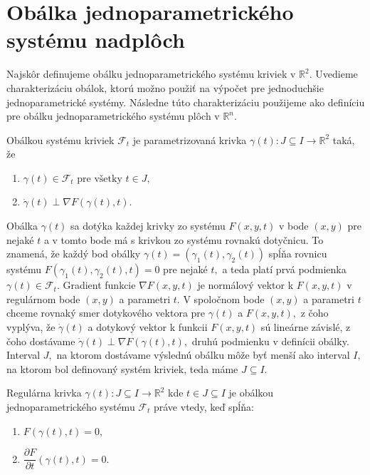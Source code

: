 \section{Obálka jednoparametrického systému nadplôch}
Najskôr definujeme obálku jednoparametrického systému kriviek v $\mathbb{R}^2$. Uvedieme charakterizáciu obálok, ktorú možno použiť na výpočet pre jednoduchšie jednoparametrické systémy. Následne túto charakterizáciu použijeme ako definíciu pre obálku jednoparametrického systému plôch v $\mathbb{R}^n$.

\begin{definition}
Obálkou systému kriviek $ \mathcal{F}_{t} $ je parametrizovaná krivka $\gamma(t) \colon J \subseteq I \rightarrow \mathbb{R}^{2}$ taká, že 
\begin{enumerate}
\item $\gamma(t) \in \mathcal{F}_{t} \text{ pre všetky } t \in J,$
\item $\dot{\gamma}(t) \perp \nabla F \left( \gamma(t), t \right).$
\end{enumerate}
\end{definition}

Obálka $\gamma(t)$ sa dotýka každej krivky zo systému $F(x,y,t)$ v bode $(x, y)$  pre nejaké $t$ a v tomto bode má s krivkou zo systému rovnakú dotyčnicu. To znamená, že každý bod obálky ${\gamma}(t) = (\gamma_{1}(t),\gamma_{2}(t))$ spĺňa rovnicu systému $F(\gamma_{1}(t),\gamma_{2}(t),t)=0$ pre nejaké $t,$ a teda platí prvá podmienka $\gamma(t) \in \mathcal{F}_{t}$. Gradient funkcie $ \nabla F(x,y,t)$ je normálový vektor k $F(x,y,t)$ v regulárnom bode $(x,y)$ a parametri $t$. V spoločnom bode $(x,y)$ a parametri $t$ chceme rovnaký smer dotykového vektora pre $\gamma(t)$ a $F(x,y,t), $ z čoho vyplýva, že $\dot{\gamma}(t)$ a dotykový vektor k funkcii $F(x,y,t)$ sú lineárne závislé, z čoho dostávame $\dot{\gamma}(t) \perp \nabla F \left( \gamma(t), t \right), $ druhú podmienku v definícii obálky. Interval $J,$ na ktorom dostávame výslednú obálku môže byť menší ako interval $I,$ na ktorom bol definovaný systém kriviek, teda máme $J \subseteq I.$

\begin{theorem}
Regulárna krivka $\gamma(t) \colon J \subseteq I \rightarrow \mathbb{R}^{2}$ kde $t \in J  \subseteq I$ je obálkou jednoparametrického systému $\mathcal{F}_{t}$ práve vtedy, keď spĺňa:
\begin{enumerate}
\item $F(\gamma(t), t) = 0, $ 
\item $\dfrac{\partial F}{\partial t}(\gamma(t), t) = 0.$
\end{enumerate}
\end{theorem}

